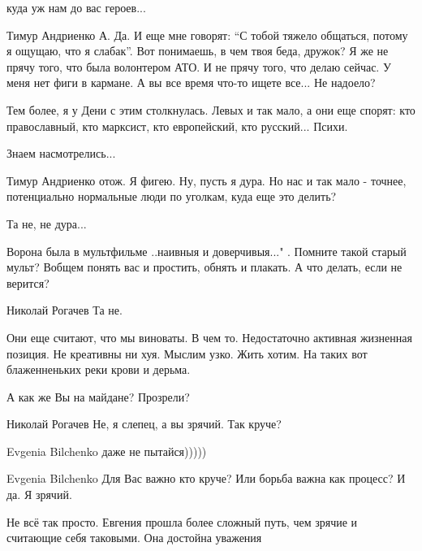 \begin{itemize}

куда уж нам до вас героев...


Тимур Андриенко А. Да. И еще мне говорят: \enquote{С тобой тяжело общаться, потому я
ощущаю, что я слабак}. Вот понимаешь, в чем твоя беда, дружок? Я же не прячу
того, что была волонтером АТО. И не прячу того, что делаю сейчас. У меня нет
фиги в кармане. А вы все время что-то ищете все... Не надоело?


Тем более, я у Дени с этим столкнулась. Левых и так мало, а они еще спорят: кто
православный, кто марксист, кто европейский, кто русский... Психи.


Знаем насмотрелись...


Тимур Андриенко отож. Я фигею. Ну, пусть я дура. Но нас и так мало - точнее,
потенциально нормальные люди по уголкам, куда еще это делить?


Та не, не дура...


Ворона была в мультфильме ..наивныя и доверчивыя..." . Помните такой старый
мульт? Вобщем понять вас и простить, обнять и плакать. А что делать, если не
верится?


Николай Рогачев Та не.

Они еще считают, что мы виноваты. В чем то. Недостаточно активная жизненная
позиция. Не креативны ни хуя. Мыслим узко. Жить хотим.  На таких вот
блаженненьких реки крови и дерьма.


А как же Вы на майдане? Прозрели?

Николай Рогачев Не, я слепец, а вы зрячий. Так круче?


Evgenia Bilchenko даже не пытайся)))))


Evgenia Bilchenko Для Вас важно кто круче? Или борьба важна как процесс? И да. Я зрячий.


Не всё так просто. Евгения прошла более сложный путь, чем зрячие и считающие себя таковыми. Она достойна уважения


\end{itemize}

